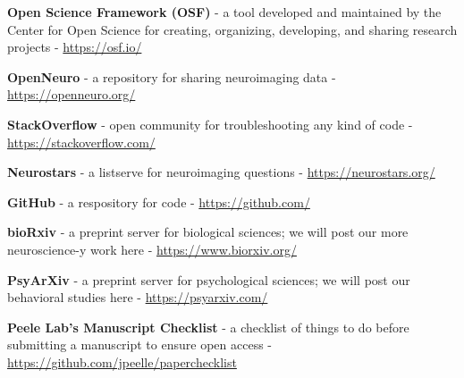 \documentclass[]{book}
\begin{document}
\textbf{Open Science Framework (OSF)} - a tool developed and maintained by the Center for Open Science for creating, organizing, developing, and sharing research projects - \url{https://osf.io/}

\textbf{OpenNeuro} - a repository for sharing neuroimaging data - \url{https://openneuro.org/}

\textbf{StackOverflow} - open community for troubleshooting any kind of code - \url{https://stackoverflow.com/}

\textbf{Neurostars} - a listserve for neuroimaging questions - \url{https://neurostars.org/}

\textbf{GitHub} - a respository for code - \url{https://github.com/}

\textbf{bioRxiv} - a preprint server for biological sciences; we will post our more neuroscience-y work here - \url{https://www.biorxiv.org/}

\textbf{PsyArXiv} - a preprint server for psychological sciences; we will post our behavioral studies here - \url{https://psyarxiv.com/}

\textbf{Peele Lab's Manuscript Checklist} - a checklist of things to do before submitting a manuscript to ensure open access - \url{https://github.com/jpeelle/paperchecklist}


\end{document}
